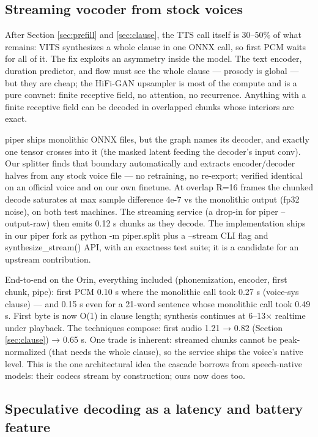 \documentclass{article}
\begin{document}
\subsection{Streaming vocoder from stock voices}
\label{sec:vocoder}

After Section \ref{sec:prefill} and \ref{sec:clause}, the TTS call itself is 30–50\% of what remains: VITS synthesizes a whole clause in one ONNX call, so first PCM waits for all of it. The fix exploits an asymmetry inside the model. The text encoder, duration predictor, and flow must see the whole clause — prosody is global — but they are cheap; the HiFi-GAN upsampler is most of the compute and is a pure convnet: finite receptive field, no attention, no recurrence. Anything with a finite receptive field can be decoded in overlapped chunks whose interiors are exact.

piper ships monolithic ONNX files, but the graph names its decoder, and exactly one tensor crosses into it (the masked latent feeding the decoder's input conv). Our splitter finds that boundary automatically and extracts encoder/decoder halves from any stock voice file — no retraining, no re-export; verified identical on an official voice and on our own finetune. At overlap R=16 frames the chunked decode saturates at max sample difference 4e-7 vs the monolithic output (fp32 noise), on both test machines. The streaming service (a drop-in for piper --output-raw) then emits 0.12 s chunks as they decode. The implementation ships in our piper fork as python -m piper.split plus a --stream CLI flag and synthesize\_stream() API, with an exactness test suite; it is a candidate for an upstream contribution.

End-to-end on the Orin, everything included (phonemization, encoder, first chunk, pipe): first PCM 0.10 s where the monolithic call took 0.27 s (voice-sys clause) — and 0.15 s even for a 21-word sentence whose monolithic call took 0.49 s. First byte is now O(1) in clause length; synthesis continues at 6–13× realtime under playback. The techniques compose: first audio 1.21 → 0.82 (Section \ref{sec:clause}) → 0.65 s. One trade is inherent: streamed chunks cannot be peak-normalized (that needs the whole clause), so the service ships the voice's native level. This is the one architectural idea the cascade borrows from speech-native models: their codecs stream by construction; ours now does too.

\subsection{Speculative decoding as a latency and battery feature}
\label{sec:speculative}
\end{document}
